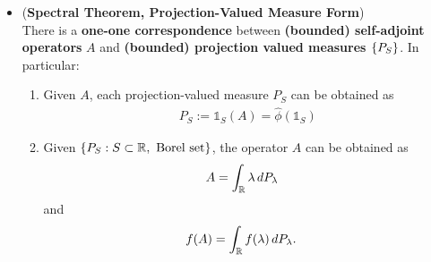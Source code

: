 \documentclass[11pt]{article}
\begin{document}
\begin{itemize}
\item \begin{theorem}(\textbf{Spectral Theorem, Projection-Valued Measure Form}) \citep{reed1980methods}\\
There is a \textbf{one-one correspondence} between \textbf{(bounded) self-adjoint operators} $A$ and \textbf{(bounded) projection valued measures $\left\{P_{S}\right\}$}. In particular:  
\begin{enumerate}
\item Given $A$, each projection-valued measure $P_{S}$ can be obtained as
\begin{align*}
P_{S} := \mathds{1}_{S}(A) = \widehat{\phi}( \mathds{1}_{S})
\end{align*} 

\item Given $\left\{P_{S}: S \subset {\mathbb R}, \text{ Borel set}\right\}$, the operator $A$ can be obtained as
\begin{align}
A &= \int_{{\mathbb R}} \lambda\, dP_{\lambda} \label{eqn: spectral_theorem_spectral_projection_integration}
\end{align} and
\begin{align}
f(A) &=  \int_{{\mathbb R}} f(\lambda)\, dP_{\lambda}.  \label{eqn: spectral_theorem_spectral_projection_integration_function_form}
\end{align}
\end{enumerate}
\end{theorem}



\end{itemize}
\end{document}

